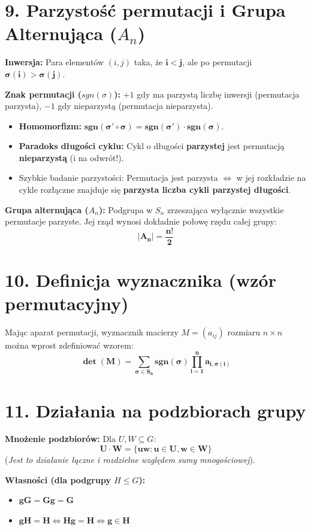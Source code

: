 \documentclass[12pt,a4paper]{article}
\begin{document}
\section*{9. Parzystość permutacji i Grupa Alternująca ($A_n$)}
\noindent\textbf{Inwersja:} Para elementów $(i, j)$ taka, że $\mathbf{i < j}$, ale po permutacji $\mathbf{\sigma(i) > \sigma(j)}$. %

\noindent\textbf{Znak permutacji ($sgn(\sigma)$):} $+1$ gdy ma parzystą liczbę inwersji (permutacja parzysta), $-1$ gdy nieparzystą (permutacja nieparzysta). %
\begin{itemize}
    \item \textbf{Homomorfizm:} $\mathbf{sgn(\sigma' \circ \sigma) = sgn(\sigma') \cdot sgn(\sigma)}$. %
    \item \textbf{Paradoks długości cyklu:} Cykl o długości \textbf{parzystej} jest permutacją \textbf{nieparzystą} (i na odwrót!). %
    \item Szybkie badanie parzystości: Permutacja jest parzysta $\iff$ w jej rozkładzie na cykle rozłączne znajduje się \textbf{parzysta liczba cykli parzystej długości}. %
\end{itemize}

\noindent\textbf{Grupa alternująca ($A_n$):} Podgrupa w $S_n$ zrzeszająca wyłącznie wszystkie permutacje parzyste. Jej rząd wynosi dokładnie połowę rzędu całej grupy: %
$$ \mathbf{|A_n| = \frac{n!}{2}} $$ %

\section*{10. Definicja wyznacznika (wzór permutacyjny)}
Mając aparat permutacji, wyznacznik macierzy $M = (a_{ij})$ rozmiaru $n \times n$ można wprost zdefiniować wzorem: %
$$ \mathbf{\det(M) = \sum_{\sigma \in S_n} sgn(\sigma) \prod_{i=1}^n a_{i, \sigma(i)}} $$ %

\section*{11. Działania na podzbiorach grupy}
\noindent\textbf{Mnożenie podzbiorów:} Dla $U, W \subseteq G$: %
$$ \mathbf{U \cdot W = \{uw : u \in U, w \in W\}} $$ %
(\textit{Jest to działanie łączne i rozdzielne względem sumy mnogościowej}). %

\noindent\textbf{Własności (dla podgrupy $H \le G$):} %
\begin{itemize}
    \item $\mathbf{gG = Gg = G}$ %
    \item $\mathbf{gH = H \iff Hg = H \iff g \in H}$ %
\end{itemize}
\end{document}

